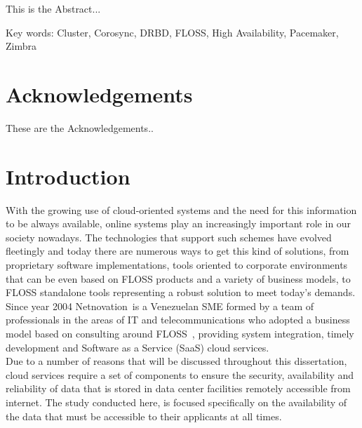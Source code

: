 \documentclass[a4paper, 12pt]{book}
\begin{document}
This is the Abstract...

\noindent
Key words: Cluster, Corosync, DRBD, FLOSS, High Availability, Pacemaker, Zimbra

%
\chapter*{Acknowledgements}
\label{chap:acknowledgements}

These are the Acknowledgements..

%
\tableofcontents  	%
\listoffigures  	%
\listoftables 		%

%
\chapter{Introduction}
\label{chap:introduction}

\noindent With the growing use of cloud-oriented systems and the need for this information to be always available, online systems play an increasingly important role in our society nowadays. The technologies that support such schemes have evolved fleetingly and today there are numerous ways to get this kind of solutions, from proprietary software implementations, tools oriented to corporate environments that can be even based on FLOSS products and a variety of business models, to FLOSS standalone tools representing a robust solution to meet today's demands.\\

\noindent Since year 2004 Netnovation\texttrademark \ is a Venezuelan SME formed by a team of professionals in the areas of IT and telecommunications who adopted a business model based on consulting around FLOSS~\cite{Daffara2}, providing system integration, timely development and Software as a Service (SaaS) cloud services.\\

\noindent Due to a number of reasons that will be discussed throughout this dissertation, cloud services require a set of components to ensure the security, availability and reliability of data that is stored in data center facilities remotely accessible from internet. The study conducted here, is focused specifically on the availability of the data that must be accessible to their applicants at all times.\\
\end{document}
